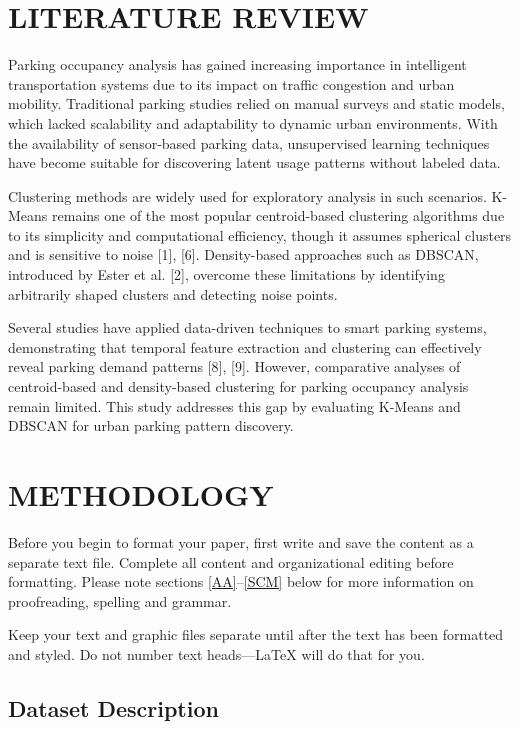 \documentclass[conference]{IEEEtran}
\begin{document}
\section{LITERATURE REVIEW}

Parking occupancy analysis has gained increasing importance in intelligent transportation systems due to its impact on traffic congestion and urban mobility. Traditional parking studies relied on manual surveys and static models, which lacked scalability and adaptability to dynamic urban environments. With the availability of sensor-based parking data, unsupervised learning techniques have become suitable for discovering latent usage patterns without labeled data.

Clustering methods are widely used for exploratory analysis in such scenarios. K-Means remains one of the most popular centroid-based clustering algorithms due to its simplicity and computational efficiency, though it assumes spherical clusters and is sensitive to noise [1], [6]. Density-based approaches such as DBSCAN, introduced by Ester et al. [2], overcome these limitations by identifying arbitrarily shaped clusters and detecting noise points.

Several studies have applied data-driven techniques to smart parking systems, demonstrating that temporal feature extraction and clustering can effectively reveal parking demand patterns [8], [9]. However, comparative analyses of centroid-based and density-based clustering for parking occupancy analysis remain limited. This study addresses this gap by evaluating K-Means and DBSCAN for urban parking pattern discovery.

\section{METHODOLOGY}
Before you begin to format your paper, first write and save the content as a 
separate text file. Complete all content and organizational editing before 
formatting. Please note sections \ref{AA}--\ref{SCM} below for more information on 
proofreading, spelling and grammar.


Keep your text and graphic files separate until after the text has been 
formatted and styled. Do not number text heads---{\LaTeX} will do that 
for you.

\subsection{Dataset Description}
\end{document}
